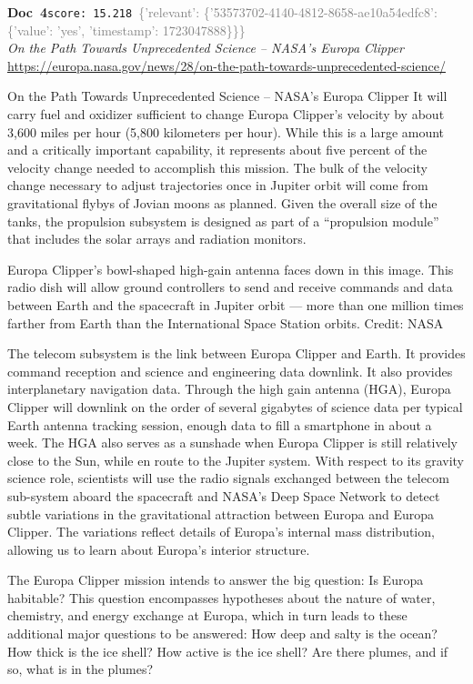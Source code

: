 \documentclass[a4paper,11pt]{article}
\begin{document}
\begin{docenv}
{\footnotesize\textcolor{doccolor}{\textbf{Doc~4}}}\hfill{\tiny\texttt{score:~15.218}}\ {\tiny\textcolor{gray}{\{'relevant': \{'53573702-4140-4812-8658-ae10a54edfc8': \{'value': 'yes', 'timestamp': 1723047888\}\}\}}}\\[3pt]
{\small\textit{On the Path Towards Unprecedented Science – NASA's Europa Clipper}}\\[2pt]
{\tiny\url{https://europa.nasa.gov/news/28/on-the-path-towards-unprecedented-science/}}\\[4pt]
{\footnotesize On the Path Towards Unprecedented Science – NASA's Europa Clipper
It will carry fuel and oxidizer sufficient to change Europa Clipper’s velocity by about 3,600 miles per hour (5,800 kilometers per hour). While this is a large amount and a critically important capability, it represents about five percent of the velocity change needed to accomplish this mission. The bulk of the velocity change necessary to adjust trajectories once in Jupiter orbit will come from gravitational flybys of Jovian moons as planned. Given the overall size of the tanks, the propulsion subsystem is designed as part of a “propulsion module” that includes the solar arrays and radiation monitors.

Europa Clipper’s bowl-shaped high-gain antenna faces down in this image. This radio dish will allow ground controllers to send and receive commands and data between Earth and the spacecraft in Jupiter orbit — more than one million times farther from Earth than the International Space Station orbits. Credit: NASA

The telecom subsystem is the link between Europa Clipper and Earth. It provides command reception and science and engineering data downlink. It also provides interplanetary navigation data. Through the high gain antenna (HGA), Europa Clipper will downlink on the order of several gigabytes of science data per typical Earth antenna tracking session, enough data to fill a smartphone in about a week. The HGA also serves as a sunshade when Europa Clipper is still relatively close to the Sun, while en route to the Jupiter system. With respect to its gravity science role, scientists will use the radio signals exchanged between the telecom sub-system aboard the spacecraft and NASA's Deep Space Network to detect subtle variations in the gravitational attraction between Europa and Europa Clipper. The variations reflect details of Europa’s internal mass distribution, allowing us to learn about Europa’s interior structure.

The Europa Clipper mission intends to answer the big question: Is Europa habitable? This question encompasses hypotheses about the nature of water, chemistry, and energy exchange at Europa, which in turn leads to these additional major questions to be answered: How deep and salty is the ocean? How thick is the ice shell? How active is the ice shell? Are there plumes, and if so, what is in the plumes?}
\end{docenv}
\end{document}
